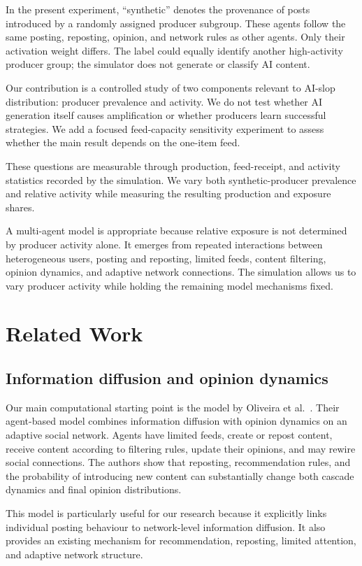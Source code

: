 \documentclass[runningheads]{llncs}
\begin{document}
In the present experiment, ``synthetic'' denotes the provenance of posts introduced by a randomly assigned producer subgroup. These agents follow the same posting, reposting, opinion, and network rules as other agents. Only their activation weight differs. The label could equally identify another high-activity producer group; the simulator does not generate or classify AI content.

Our contribution is a controlled study of two components relevant to AI-slop distribution: producer prevalence and activity. We do not test whether AI generation itself causes amplification or whether producers learn successful strategies. We add a focused feed-capacity sensitivity experiment to assess whether the main result depends on the one-item feed.

These questions are measurable through production, feed-receipt, and activity statistics recorded by the simulation. We vary both synthetic-producer prevalence and relative activity while measuring the resulting production and exposure shares.

A multi-agent model is appropriate because relative exposure is not determined by producer activity alone. It emerges from repeated interactions between heterogeneous users, posting and reposting, limited feeds, content filtering, opinion dynamics, and adaptive network connections. The simulation allows us to vary producer activity while holding the remaining model mechanisms fixed.

\section{Related Work}

\subsection{Information diffusion and opinion dynamics}
Our main computational starting point is the model by Oliveira et al.~\cite{oliveira2026}. Their agent-based model combines information diffusion with opinion dynamics on an adaptive social network. Agents have limited feeds, create or repost content, receive content according to filtering rules, update their opinions, and may rewire social connections. The authors show that reposting, recommendation rules, and the probability of introducing new content can substantially change both cascade dynamics and final opinion distributions.

This model is particularly useful for our research because it explicitly links individual posting behaviour to network-level information diffusion. It also provides an existing mechanism for recommendation, reposting, limited attention, and adaptive network structure.
\end{document}
